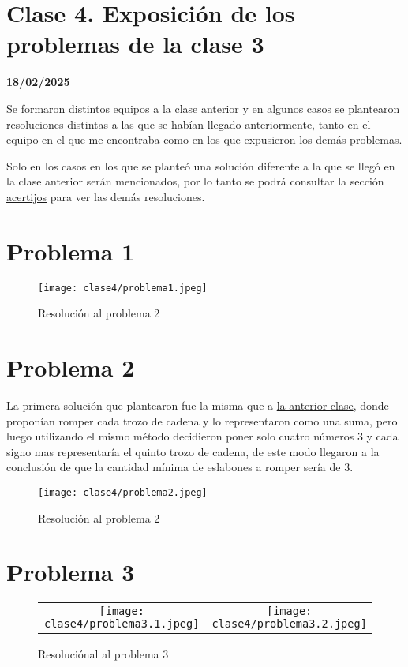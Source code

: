 \section{Clase 4. Exposición de los problemas de la clase 3}
\textbf{18/02/2025}

Se formaron distintos equipos a la clase anterior y en algunos casos se plantearon resoluciones distintas a las que se habían llegado anteriormente, tanto en el equipo en el que me encontraba como en los que expusieron los demás problemas. 

Solo en los casos en los que se planteó una solución diferente a la que se llegó en la clase anterior serán mencionados, por lo tanto se podrá consultar la sección \hyperref[sec:C3ACERTIJOS]{acertijos} para ver las demás resoluciones.

\section{Problema 1}
\begin{figure}[h!]
    \begin{center}
        \texttt{[image: clase4/problema1.jpeg]}
    \end{center}
    \caption{Resolución al problema 2}
\end{figure}

\section{Problema 2}
La primera solución que plantearon fue la misma que a \hyperref[ejem:c3P2]{la anterior clase}, donde proponían romper cada trozo de cadena y lo representaron como una suma, pero luego utilizando el mismo método decidieron poner solo cuatro números 3 y cada signo mas representaría el quinto trozo de cadena, de este modo llegaron a la conclusión de que la cantidad mínima de eslabones a romper sería de 3.
\begin{figure}[h!]
    \begin{center}
        \texttt{[image: clase4/problema2.jpeg]}
    \end{center}
    \caption{Resolución al problema 2}
\end{figure}

\section{Problema 3}
\begin{figure}[h!]
    \begin{center}
        \begin{tabular}{cc}
            \texttt{[image: clase4/problema3.1.jpeg]}&\texttt{[image: clase4/problema3.2.jpeg]}
        \end{tabular}
    \end{center}
    \caption{Resoluciónal al problema 3}
\end{figure}

